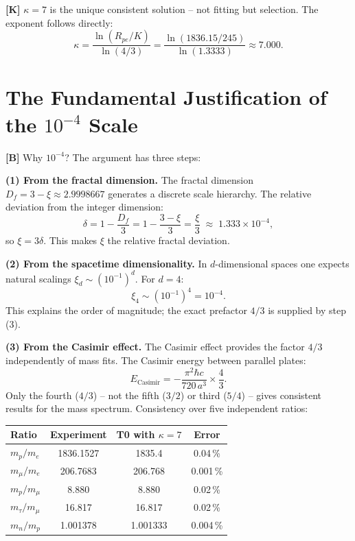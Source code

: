 \textbf{[K]} $\kappa=7$ is the unique consistent solution -- not fitting but
selection. The exponent follows directly:
\[
  \kappa = \frac{\ln(R_{pe}/K)}{\ln(4/3)}
  = \frac{\ln(1836{.}15/245)}{\ln(1{.}3333)} \approx 7{.}000.
\]

\section{The Fundamental Justification of the $10^{-4}$ Scale}

\textbf{[B]} Why $10^{-4}$? The argument has three steps:

\textbf{(1) From the fractal dimension.} The fractal dimension
$D_f=3-\xi\approx2{.}9998667$ generates a discrete scale hierarchy. The
relative deviation from the integer dimension:
\[
  \delta = 1-\frac{D_f}{3} = 1-\frac{3-\xi}{3} = \frac{\xi}{3}
  \;\approx\; 1{.}333\times10^{-4},
\]
so $\xi=3\delta$. This makes $\xi$ the relative fractal deviation.

\textbf{(2) From the spacetime dimensionality.} In $d$-dimensional spaces
one expects natural scalings $\xi_d\sim(10^{-1})^d$. For $d=4$:
\[
  \xi_4\sim(10^{-1})^4 = 10^{-4}.
\]
This explains the order of magnitude; the exact prefactor $4/3$ is supplied
by step (3).

\textbf{(3) From the Casimir effect.} The Casimir effect provides the factor
$4/3$ independently of mass fits. The Casimir energy between parallel plates:
\[
  E_\text{Casimir} = -\frac{\pi^2\hbar c}{720\,a^3}\times\frac43.
\]
Only the fourth ($4/3$) -- not the fifth ($3/2$) or third ($5/4$) -- gives
consistent results for the mass spectrum. Consistency over five independent
ratios:

\begin{center}
\renewcommand{\arraystretch}{1.3}
{\small
\begin{tabular}{lccc}
\toprule
Ratio & Experiment & T0 with $\kappa=7$ & Error \\
\midrule
$m_p/m_e$       & 1836{.}1527 & 1835{.}4 & 0{.}04\,\% \\
$m_\mu/m_e$     & 206{.}7683  & 206{.}768 & 0{.}001\,\% \\
$m_p/m_\mu$     & 8{.}880     & 8{.}880 & 0{.}02\,\% \\
$m_\tau/m_\mu$  & 16{.}817    & 16{.}817 & 0{.}02\,\% \\
$m_n/m_p$       & 1{.}001378  & 1{.}001333 & 0{.}004\,\% \\
\bottomrule
\end{tabular}
}
\renewcommand{\arraystretch}{1.0}
\end{center}

